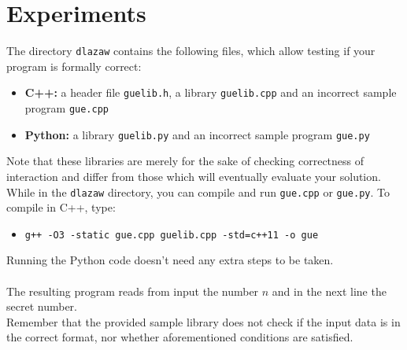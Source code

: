 \documentclass{spiral}
\begin{document}
\section{Experiments}
    The directory \texttt{dlazaw} contains the following files,
    which allow testing if your program is formally correct:
    \begin{itemize}
        \item \textbf{C++:} a header file \texttt{guelib.h},
            a library \texttt{guelib.cpp} and an incorrect sample program
            \texttt{gue.cpp}
        \item \textbf{Python:} a library \texttt{guelib.py} and
            an incorrect sample program \texttt{gue.py}
    \end{itemize}

    \noindent Note that these libraries are merely for the sake of checking
    correctness of interaction and differ from those which will eventually
    evaluate your solution.
    While in the \texttt{dlazaw} directory,
    you can compile and run \texttt{gue.cpp} or \texttt{gue.py}.
    To compile in C++, type:

    \begin{itemize}
        \item \texttt{g++ -O3 -static gue.cpp guelib.cpp -std=c++11 -o gue}
    \end{itemize}

    \noindent Running the Python code doesn't need any extra steps to be taken.\\
    \\
    The resulting program reads from input the number $n$
    and in the next line the secret number.
    \\
    Remember that the provided sample library does not check
    if the input data is in the correct format,
    nor whether aforementioned conditions are satisfied.
\end{document}
